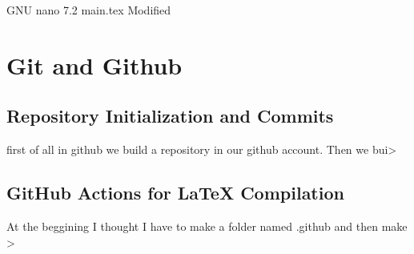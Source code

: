   GNU nano 7.2                        main.tex                        Modified


\maketitle

\pagestyle{fancy}
\fancyhead[R]{}

\tableofcontents
\newpage
{}
\fancyhead[R]{}
\section{Git and Github}
\subsection{ Repository Initialization and Commits}
first of all in github we build a repository in our github account. Then we bui>
\subsection{ GitHub Actions for LaTeX Compilation}
At the beggining I thought I have to make a folder named .github and then make >



